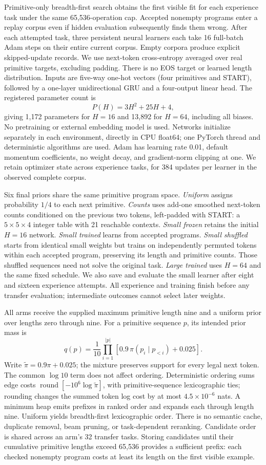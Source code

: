 \documentclass[11pt]{article}
\begin{document}
Primitive-only breadth-first search obtains the first visible fit for each
experience task under the same 65,536-operation cap. Accepted nonempty
programs enter a replay corpus even if hidden evaluation subsequently finds
them wrong. After each attempted task, three persistent neural learners each
take 16 full-batch Adam steps on their entire current corpus. Empty corpora
produce explicit skipped-update records. We use next-token cross-entropy
averaged over real primitive targets, excluding padding. There is no EOS
target or learned length distribution. Inputs are five-way one-hot vectors
(four primitives and START), followed by a one-layer unidirectional GRU and
a four-output linear head. The registered parameter count is
\[
 P(H)=3H^2+25H+4,
\]
giving 1,172 parameters for $H=16$ and 13,892 for $H=64$, including all biases.
No pretraining or external embedding model is used. Networks initialize
separately in each environment, directly in CPU float64; one PyTorch thread and deterministic algorithms are
used. Adam has learning rate 0.01, default momentum coefficients, no weight
decay, and gradient-norm clipping at one. We retain optimizer state across
experience tasks, for 384 updates per learner in the observed complete corpus.

Six final priors share the same primitive program space. \emph{Uniform}
assigns probability $1/4$ to each next primitive. \emph{Counts} uses add-one
smoothed next-token counts conditioned on the previous two tokens, left-padded
with START: a $5\times5\times4$ integer table with 21 reachable contexts.
\emph{Small frozen} retains the initial $H=16$ network. \emph{Small trained}
learns from accepted programs. \emph{Small shuffled} starts from identical
small weights but trains on independently permuted tokens within each accepted
program, preserving its length and primitive counts. Those shuffled sequences
need not solve the original task. \emph{Large trained} uses $H=64$ and the
same fixed schedule. We also save and evaluate the small learner after eight
and sixteen experience attempts. All experience and training finish before
any transfer evaluation; intermediate outcomes cannot select later weights.

All arms receive the supplied maximum primitive length nine and a uniform
prior over lengths zero through nine. For a primitive sequence $p$, its
intended prior mass is
\[
 q(p)=\frac{1}{10}\prod_{i=1}^{|p|}
 \left[0.9\,\pi(p_i\mid p_{<i})+0.025\right].
\]
Write $\tilde\pi=0.9\pi+0.025$; the mixture preserves support for every legal
next token. The common $\log 10$ term does not affect ordering. Deterministic
ordering sums edge costs $\operatorname{round}[-10^6\log\tilde\pi]$,
with primitive-sequence lexicographic ties; rounding changes the summed
token log cost by at most $4.5\times10^{-6}$ nats. A minimum heap emits
prefixes in ranked order and expands each through length nine. Uniform yields
breadth-first lexicographic order. There is no semantic cache, duplicate
removal, beam pruning, or task-dependent reranking. Candidate order is shared
across an arm's 32 transfer tasks. Storing candidates until their cumulative
primitive lengths exceed 65,536 provides a sufficient prefix: each checked
nonempty program costs at least its length on the first visible example.
\end{document}
